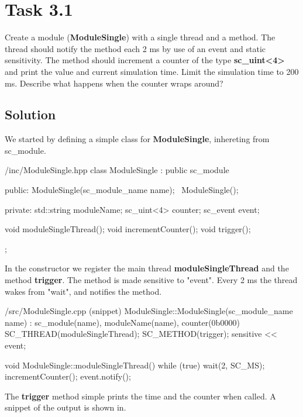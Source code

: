 \documentclass[../main.tex]{subfiles}
\begin{document}
\section*{Task 3.1}

Create a module (\textbf{ModuleSingle}) with a single thread and a method. The thread should notify the method each 2 ms by use of an event and static sensitivity. The method should increment a counter of the type \textbf{sc\_uint<4>} and print the value and current simulation time. Limit the simulation time to 200 ms. Describe what happens when the counter wraps around?

\subsection*{Solution}

We started by defining a simple class for \textbf{ModuleSingle}, inhereting from sc\_module.

\begin{myminted}{/inc/ModuleSingle.hpp}
class ModuleSingle : public sc_module {
public:
    ModuleSingle(sc_module_name name);
    ~ModuleSingle();

private:
    std::string moduleName;
    sc_uint<4> counter;
    sc_event event;

    void moduleSingleThread();
    void incrementCounter();
    void trigger();
};
\end{myminted}

In the constructor we register the main thread \textbf{moduleSingleThread} and the method \textbf{trigger}. The method is made sensitive to "event". Every 2 ms the thread wakes from "wait", and notifies the method.

\begin{myminted}{/src/ModuleSingle.cpp (snippet)}
ModuleSingle::ModuleSingle(sc_module_name name) 
    : sc_module(name), moduleName(name), counter(0b0000)
{
    SC_THREAD(moduleSingleThread);
    SC_METHOD(trigger);
    sensitive << event;
}

void ModuleSingle::moduleSingleThread() {
    while (true) {
        wait(2, SC_MS); 
        incrementCounter();
        event.notify();
    }
}
\end{myminted}

\newpage

The \textbf{trigger} method simple prints the time and the counter when called. A snippet of the output is shown in.
\end{document}
